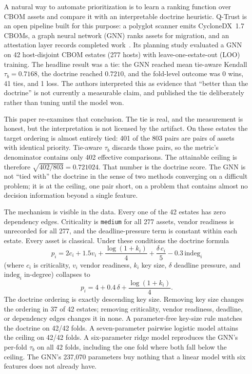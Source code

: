 \documentclass[conference,10pt]{IEEEtran}
\newcommand{\tb}{\tau_b}
\begin{document}
A natural way to automate prioritization is to learn a ranking function over CBOM assets and
compare it with an interpretable doctrine heuristic. Q-Trust is an open pipeline built for this
purpose: a polyglot scanner emits CycloneDX~1.7 CBOMs, a graph neural network (GNN) ranks
assets for migration, and an attestation layer records completed
work~\cite{qtrust_repo}. Its planning study evaluated a GNN on 42 host-disjoint CBOM estates
(277 hosts) with leave-one-estate-out (LOO) training. The headline result was a tie: the GNN
reached mean tie-aware Kendall $\tb=0.7168$, the doctrine reached $0.7210$, and the fold-level
outcome was 0 wins, 41 ties, and 1 loss. The authors interpreted this as evidence that
``better than the doctrine'' is not currently a measurable claim, and published the tie
deliberately rather than tuning until the model won.

This paper re-examines that conclusion. The tie is real, and the measurement is honest, but the
interpretation is not licensed by the artifact. On these estates the target ordering is almost
entirely tied: 401 of the 803 pairs are pairs of assets with identical priority. Tie-aware
$\tb$ discards those pairs, so the metric's denominator contains only 402 effective
comparisons. The attainable ceiling is therefore $\sqrt{402/803}=0.721024$. That number is the
doctrine score. The GNN is not ``tied with'' the doctrine in the sense of two methods
converging on a difficult problem; it is at the ceiling, one pair short, on a problem that
contains almost no decision information beyond a single feature.

The mechanism is visible in the data. Every one of the 42 estates has zero dependency edges.
Criticality is \texttt{medium} for all 277 assets, vendor readiness is unrecorded for all 277,
and the deadline-pressure term is constant within each estate. Every asset is classical. Under
these conditions the doctrine formula
\begin{equation}
p_i = 2c_i + 1.5v_i + \frac{\log(1+k_i)}{4}
      + \frac{\delta\,c_i}{5} - 0.3\,\mathrm{indeg}_i
\label{eq:doctrine}
\end{equation}
(where $c_i$ is criticality, $v_i$ vendor readiness, $k_i$ key size, $\delta$ deadline pressure,
and $\mathrm{indeg}_i$ in-degree) collapses to
\begin{equation}
p_i = 4 + 0.4\,\delta + \frac{\log(1+k_i)}{4}.
\label{eq:collapse}
\end{equation}
The doctrine ordering is exactly descending key size. Removing key size changes the ordering in
37 of 42 estates; removing criticality, vendor readiness, deadline, or dependency edges changes
it in none. A parameter-free key-size rule matches the doctrine on 42/42 folds. A seven-parameter
pairwise logistic model attains the ceiling on 42/42 folds. A six-parameter ridge model
reproduces the GNN's per-fold $\tb$ on all 42 folds, including the one fold where both fall
below the ceiling. The GNN's 237{,}070 parameters buy nothing that a linear model with six
features does not already have.
\end{document}
